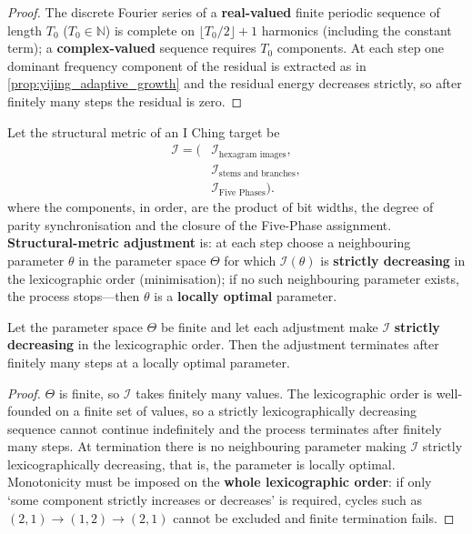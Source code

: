 \begin{proof}
The discrete Fourier series of a \textbf{real-valued} finite periodic sequence of length $T_0$ ($T_0\in\mathbb N$) is complete on $\lfloor T_0/2\rfloor+1$ harmonics (including the constant term); a \textbf{complex-valued} sequence requires $T_0$ components. At each step one dominant frequency component of the residual is extracted as in \cref{prop:yijing_adaptive_growth} and the residual energy decreases strictly, so after finitely many steps the residual is zero.
\end{proof}

\begin{definition}\label{def:yijing_structure_metric_adjustment}
Let the structural metric of an I Ching target be
\[
\begin{aligned}
\mathcal I=\bigl(&\mathcal I_{\text{hexagram images}},\\
                  &\mathcal I_{\text{stems and branches}},\\
                  &\mathcal I_{\text{Five Phases}}\bigr).
\end{aligned}
\]
where the components, in order, are the product of bit widths, the degree of parity synchronisation and the closure of the Five-Phase assignment.
\textbf{Structural-metric adjustment} is: at each step choose a neighbouring parameter $\theta$ in the parameter space $\Theta$ for which $\mathcal I(\theta)$ is \textbf{strictly decreasing} in the lexicographic order (minimisation); if no such neighbouring parameter exists, the process stops---then $\theta$ is a \textbf{locally optimal} parameter.
\end{definition}

\begin{proposition}\label{prop:yijing_structure_metric_convergence}
Let the parameter space $\Theta$ be finite and let each adjustment make $\mathcal I$ \textbf{strictly decreasing} in the lexicographic order. Then the adjustment terminates after finitely many steps at a locally optimal parameter.
\end{proposition}

\begin{proof}
$\Theta$ is finite, so $\mathcal I$ takes finitely many values. The lexicographic order is well-founded on a finite set of values, so a strictly lexicographically decreasing sequence cannot continue indefinitely and the process terminates after finitely many steps. At termination there is no neighbouring parameter making $\mathcal I$ strictly lexicographically decreasing, that is, the parameter is locally optimal. Monotonicity must be imposed on the \textbf{whole lexicographic order}: if only `some component strictly increases or decreases' is required, cycles such as $(2,1)\to(1,2)\to(2,1)$ cannot be excluded and finite termination fails.
\end{proof}

